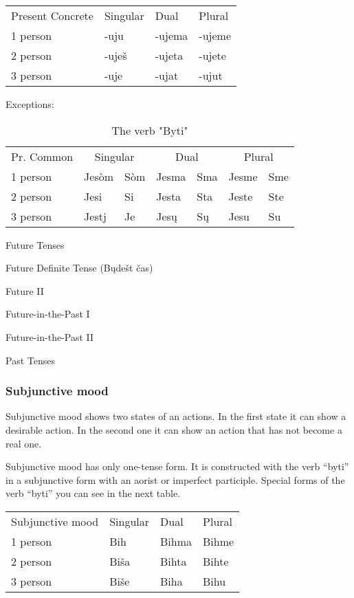 \begin{table}[h]
	\begin{tabular}{llll}
		Present Concrete & Singular & Dual & Plural \\
		1 person & -uju & -ujema & -ujeme \\
		2 person & -uješ & -ujeta & -ujete \\
		3 person & -uje & -ujat & -ujut
	\end{tabular}
\end{table}


Exceptions:

\begin{table}[h]
	\caption{The verb "Byti"}
	\begin{tabular}{lllllll}
		Pr. Common
			& \multicolumn{2}{c}{Singular}
			 & \multicolumn{2}{c}{Dual}
			 & \multicolumn{2}{c}{Plural} \\
		1 person & Jesòm & Sòm & Jesma & Sma & Jesme & Sme \\
		2 person & Jesi & Si & Jesta & Sta & Jeste & Ste \\
		3 person & Jestj & Je & Jesų & Sų & Jesu & Su
	\end{tabular}
\end{table}


Future Tenses

Future Definite Tense (Bųdešt čas)

Future II

Future-in-the-Past I

Future-in-the-Past II

Past Tenses

\subsubsection{Subjunctive mood}

Subjunctive mood shows two states of an actions. In the first state it can show a desirable action. In the second one it can show an action that has not become a real one. 

Subjunctive mood has only one-tense form. It is constructed with the verb “byti” in a subjunctive form with an aorist or imperfect participle. Special forms of the verb “byti” you can see in the next table.

\begin{table}
	\begin{tabular}{llll}
		Subjunctive mood & Singular & Dual & Plural \\
		1 person & Bih & Bihma & Bihme \\
		2 person & Biša & Bihta & Bihte \\
		3 person & Biše & Biha & Bihu
	\end{tabular}
\end{table}

